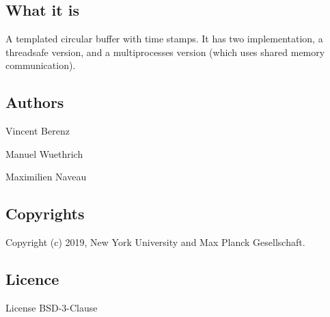 \subsection*{What it is}

A templated circular buffer with time stamps. It has two implementation, a threadsafe version, and a multiprocesses version (which uses shared memory communication).

\subsection*{Authors}


\begin{DoxyItemize}
\item Vincent Berenz
\item Manuel Wuethrich
\item Maximilien Naveau
\end{DoxyItemize}

\subsection*{Copyrights}

Copyright (c) 2019, New York University and Max Planck Gesellschaft.

\subsection*{Licence}

License B\+S\+D-\/3-\/\+Clause 